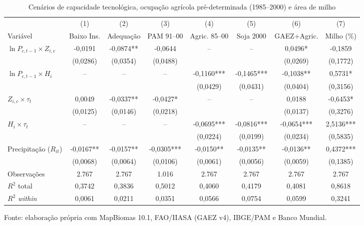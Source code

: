 \begin{table}[htbp]
\centering
\scriptsize
\setlength{\tabcolsep}{2.8pt}
\captionstyle{\centering}
\normalcaption
\caption{Cenários de capacidade tecnológica, ocupação agrícola pré-determinada (1985--2000) e área de milho}
\label{tab:h1-margens-tecnologia}
\begin{tabular}{lccccccc}
\hline
 & (1) & (2) & (3) & (4) & (5) & (6) & (7) \\
Variável & Baixo Ins. & Adequação & PAM 91--00 & Agric. 85--00 & Soja 2000 & GAEZ+Agric. & Milho (\%) \\
\hline
$\ln P_{c,t-1} \times Z_{i,c}$ & -0,0191 & -0,0874** & -0,0644 & -- & -- & 0,0496* & -0,1859 \\
 & (0,0286) & (0,0354) & (0,0488) &  &  & (0,0269) & (0,1772) \\
$\ln P_{c,t-1} \times H_i$ & -- & -- & -- & -0,1160*** & -0,1465*** & -0,1038** & 0,5731* \\
 &  &  &  & (0,0429) & (0,0431) & (0,0404) & (0,3156) \\
$Z_{i,c} \times \tau_t$ & 0,0049 & -0,0337** & -0,0427* & -- & -- & 0,0188 & -0,6453* \\
 & (0,0125) & (0,0146) & (0,0218) &  &  & (0,0137) & (0,3276) \\
$H_i \times \tau_t$ & -- & -- & -- & -0,0695*** & -0,0816*** & -0,0654*** & 2,5136*** \\
 &  &  &  & (0,0224) & (0,0199) & (0,0234) & (0,5835) \\
Precipitação ($R_{it}$) & -0,0167** & -0,0157** & -0,0305*** & -0,0150** & -0,0135** & -0,0136** & 0,4372*** \\
 & (0,0068) & (0,0064) & (0,0106) & (0,0061) & (0,0056) & (0,0059) & (0,1385) \\
\hline
Observações & 2.767 & 2.767 & 1.016 & 2.767 & 2.767 & 2.767 & 2.767 \\
$R^2$ total & 0,3742 & 0,3836 & 0,5012 & 0,4060 & 0,4179 & 0,4081 & 0,8618 \\
$R^2$ \textit{within} & 0,0061 & 0,0211 & 0,0351 & 0,0566 & 0,0754 & 0,0599 & 0,3241 \\
\hline
\end{tabular}
\par\smallskip\begin{minipage}{\textwidth}\footnotesize
\centering
Fonte: elaboração própria com MapBiomas 10.1, FAO/IIASA (GAEZ v4), IBGE/PAM e Banco Mundial.
\end{minipage}
\end{table}
